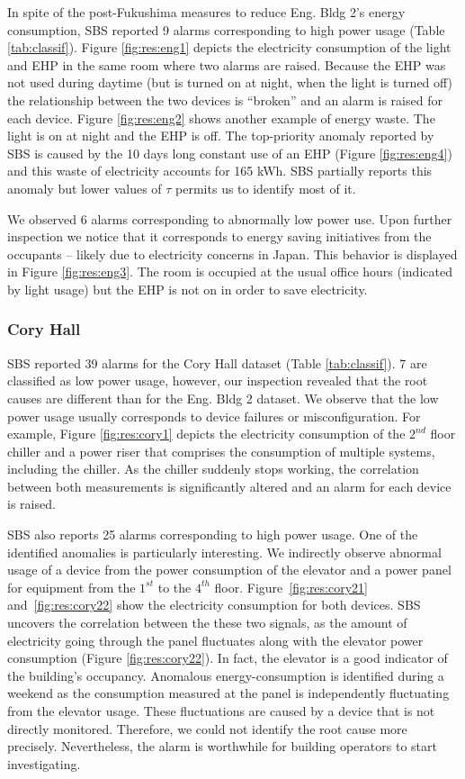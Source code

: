 In spite of the post-Fukushima measures to reduce Eng. Bldg 2's energy consumption, 
SBS reported 9 alarms corresponding to high power usage (Table \ref{tab:classif}).
Figure \ref{fig:res:eng1} depicts the electricity consumption of the light and EHP in the same room where two alarms are raised.
Because the EHP was not used during daytime (but is turned on at night, when the light is turned off) the relationship between the two devices 
is ``broken'' and an alarm is raised for each device.
Figure \ref{fig:res:eng2} shows another example of energy waste.  The light is on at night and the EHP is off.
The top-priority anomaly reported by SBS is caused by the 10 days long constant use of an EHP (Figure \ref{fig:res:eng4}) and this 
waste of electricity accounts for 165 kWh.
SBS partially reports this anomaly but lower values of $\tau$ permits us to identify most of it.


We observed 6 alarms corresponding to abnormally low power use.  Upon further inspection we notice that it corresponds to energy saving
 initiatives from the occupants -- likely due to electricity concerns in Japan.
This behavior is displayed in Figure \ref{fig:res:eng3}.  The room is occupied at the usual office hours (indicated by light usage)  but the 
EHP is not on in order to save electricity.

\subsubsection{Cory Hall}
SBS reported 39 alarms for the Cory Hall dataset (Table \ref{tab:classif}).
 7 are classified as low power usage, however, our inspection revealed that the root causes are different than for the Eng. Bldg 2 dataset.
We observe that the low power usage usually corresponds to device failures or misconfiguration.  
For example, Figure \ref{fig:res:cory1} depicts the electricity consumption of the $2^{nd}$ floor chiller and a power riser that comprises the consumption of multiple systems, including the chiller.
As the chiller suddenly stops working, the correlation between both measurements is significantly altered and an alarm for each device is raised.

SBS also reports 25 alarms corresponding to high power usage. 
One of the identified anomalies is particularly interesting.
We indirectly observe abnormal usage of a device from the power consumption of the elevator and a power panel for equipment from 
the $1^{st}$ to the $4^{th}$ floor.
Figure~\ref{fig:res:cory21} and~\ref{fig:res:cory22} show the electricity consumption for both devices. 
SBS uncovers the correlation between the these two signals, as the amount of electricity going through the panel fluctuates along with the elevator power consumption (Figure \ref{fig:res:cory22}).
In fact, the elevator is a good indicator of the building's occupancy.
Anomalous energy-consumption is identified during a weekend as the consumption measured at the panel is independently fluctuating from the elevator usage.
These fluctuations are caused by a device that is not directly monitored.  Therefore, we could not identify the root cause more precisely. 
 Nevertheless, the alarm is worthwhile for building operators to start investigating.

